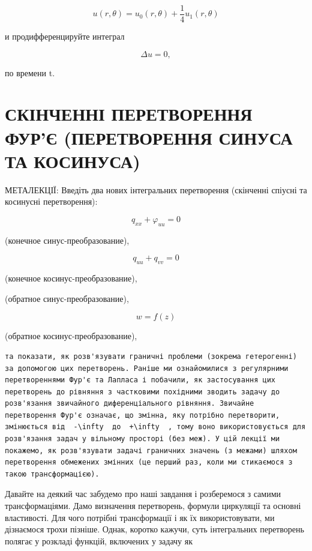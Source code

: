 \documentclass[
  ukrainian,
]{article}
\begin{document}
\[
u(r, \theta) = u_0(r, \theta) + \frac{1}{4}u_1(r, \theta)
\]

и продифференцируйте интеграл

\[
\Delta u = 0,
\]

по времени t.

\section{СКІНЧЕННІ ПЕРЕТВОРЕННЯ ФУР'Є (ПЕРЕТВОРЕННЯ СИНУСА ТА
КОСИНУСА)}\label{ux441ux43aux456ux43dux447ux435ux43dux43dux456-ux43fux435ux440ux435ux442ux432ux43eux440ux435ux43dux43dux44f-ux444ux443ux440ux454-ux43fux435ux440ux435ux442ux432ux43eux440ux435ux43dux43dux44f-ux441ux438ux43dux443ux441ux430-ux442ux430-ux43aux43eux441ux438ux43dux443ux441ux430}

МЕТАЛЕКЦІЇ: Введіть два нових інтегральних перетворення (скінченні
спіусні та косинусні перетворення):

\[
q_{xx} + \varphi_{uu} = 0
\]

(конечное синус-преобразование),

\[
q_{uu} + q_{vv} = 0
\]

(конечное косинус-преобразование),

(обратное синус-преобразование),

\[
w = f(z)
\]

(обратное косинус-преобразование),

\begin{verbatim}
та показати, як розв'язувати граничні проблеми (зокрема гетерогенні) за допомогою цих перетворень. Раніше ми ознайомилися з регулярними перетвореннями Фур'є та Лапласа і побачили, як застосування цих перетворень до рівняння з частковими похідними зводить задачу до розв'язання звичайного диференціального рівняння. Звичайне перетворення Фур'є означає, що змінна, яку потрібно перетворити, змінюється від  -\infty  до  +\infty  , тому воно використовується для розв'язання задач у вільному просторі (без меж). У цій лекції ми покажемо, як розв'язувати задачі граничних значень (з межами) шляхом перетворення обмежених змінних (це перший раз, коли ми стикаємося з такою трансформацією).
\end{verbatim}

Давайте на деякий час забудемо про наші завдання і розберемося з самими
трансформаціями. Дамо визначення перетворень, формули циркуляції та
основні властивості. Для чого потрібні трансформації і як їх
використовувати, ми дізнаємося трохи пізніше. Однак, коротко кажучи,
суть інтегральних перетворень полягає у розкладі функцій, включених у
задачу як
\end{document}
